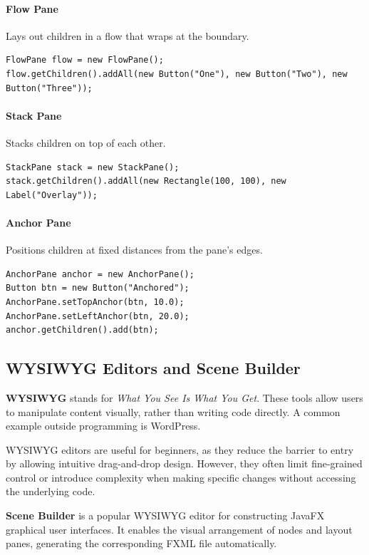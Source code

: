 \documentclass{article}
\begin{document}
\paragraph{\textbf{Flow Pane}}

Lays out children in a flow that wraps at the boundary.
\begin{verbatim}
FlowPane flow = new FlowPane();
flow.getChildren().addAll(new Button("One"), new Button("Two"), new Button("Three"));
\end{verbatim}

\paragraph{\textbf{Stack Pane}}

Stacks children on top of each other.
\begin{verbatim}
StackPane stack = new StackPane();
stack.getChildren().addAll(new Rectangle(100, 100), new Label("Overlay"));
\end{verbatim}

\paragraph{\textbf{Anchor Pane}}

Positions children at fixed distances from the pane's edges.
\begin{verbatim}
AnchorPane anchor = new AnchorPane();
Button btn = new Button("Anchored");
AnchorPane.setTopAnchor(btn, 10.0);
AnchorPane.setLeftAnchor(btn, 20.0);
anchor.getChildren().add(btn);
\end{verbatim}

\subsection{WYSIWYG Editors and Scene Builder}

\textbf{WYSIWYG} stands for \textit{What You See Is What You Get}. These tools allow users to manipulate content visually, rather than writing code directly. A common example outside programming is WordPress.

WYSIWYG editors are useful for beginners, as they reduce the barrier to entry by allowing intuitive drag-and-drop design. However, they often limit fine-grained control or introduce complexity when making specific changes without accessing the underlying code.

\medskip
\textbf{Scene Builder} is a popular WYSIWYG editor for constructing JavaFX graphical user interfaces. It enables the visual arrangement of nodes and layout panes, generating the corresponding FXML file automatically.
\end{document}
